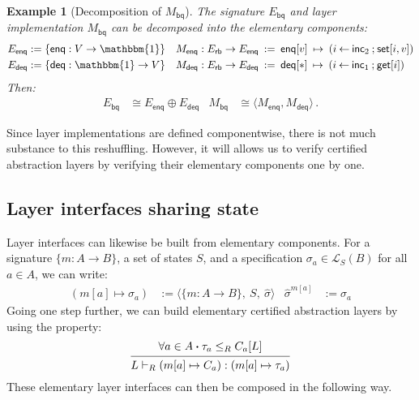 \documentclass[11pt,oneside,draft]{book}
\newtheorem{example}[theorem]{Example}
\theoremstyle{definition}
\newcommand{\kw}[1]{\ensuremath{ \mathsf{#1} }}
\newcommand{\bdot}{\boldsymbol{\cdot}}
\begin{document}

\begin{example}[Decomposition of $M_\kw{bq}$]
The signature $E_\kw{bq}$ and layer implementation $M_\kw{bq}$
can be decomposed into the elementary components:
\begin{align*}
  E_\kw{enq} &:= \{ \kw{enq} : V \rightarrow \mathbbm{1} \} &
  M_\kw{enq} : E_\kw{rb} \rightarrow E_\kw{enq} \: &:= \:
    \kw{enq}[v] \: \mapsto \:
     (i \mathbin{\leftarrow} \kw{inc}_2 \mathbin{;}
      \kw{set}[i, v]) \\
  E_\kw{deq} &:= \{ \kw{deq} : \mathbbm{1} \rightarrow V \} &
  M_\kw{deq} : E_\kw{rb} \rightarrow E_\kw{deq} \: &:= \:
    \kw{deq}[*] \:\mapsto\:
     (i \mathbin{\leftarrow} \kw{inc}_1 \mathbin{;}
      \kw{get}[i])
\end{align*}
Then:
\begin{align*}
  E_\kw{bq} &\cong E_\kw{enq} \oplus E_\kw{deq} &
  M_\kw{bq} &\cong \langle M_\kw{enq}, M_\kw{deq} \rangle \,.
\end{align*}
\end{example}

Since layer implementations are defined componentwise,
there is not much substance to this reshuffling.
However,
it will allows us to verify certified abstraction layers
by verifying their elementary components one by one.


\subsection{Layer interfaces sharing state} \label{sec:layerprod} %

Layer interfaces can likewise be built from elementary components.
For a signature $\{ m : A \rightarrow B \}$,
a set of states $S$,
and a specification $\sigma_a \in \mathcal{L}_S(B)$ for all $a \in A$,
we can write:
\begin{align*}
  (m[a] \mapsto \sigma_a) &:=
  \langle
    \{ m : A \rightarrow B \}, \:
    S, \:
    \hat{\sigma}
  \rangle
  &
  \hat{\sigma}^{m[a]} &:= \sigma_a
\end{align*}
Going one step further,
we can build elementary certified abstraction layers
by using the property:
\[
  \begin{prooftree}
    \hypo{\forall a \in A \bdot \tau_a \le_R C_a[L]}
    \infer1{L \vdash_R (m[a] \mapsto C_a) : (m[a] \mapsto \tau_a)}
  \end{prooftree}
\]
These elementary layer interfaces
can then be composed in the following way.
\end{document}
